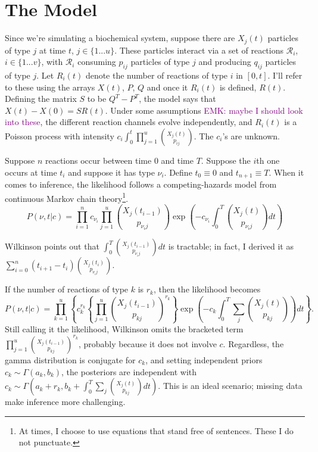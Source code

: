 \documentclass{article}
\newcommand\EMK[1]{\textcolor{purple}{EMK: #1}}
\begin{document}
\section{The Model}
Since we're simulating a biochemical system, suppose there are $X_{j}(t)$ particles of type $j$ at time $t$, $j\in \{1 ... u\}$. These particles interact via a set of reactions $\mathcal{R}_{i}$, $i\in \{1 ... v\}$, with $\mathcal{R}_{i}$ consuming $p_{ij}$ particles of type $j$ and producing $q_{ij}$ particles of type $j$. Let $R_{i}(t)$ denote the number of reactions of type $i$ in $[0,t]$. I'll refer to these using the arrays $X(t)$, $P$, $Q$ and once it $R_{i}(t)$ is defined, $R(t)$. Defining the matrix $S$ to be $Q^T-P^T$, the model says that $X(t) - X(0) = SR(t)$. Under some assumptions \EMK{maybe I should look into these}, the different reaction channels evolve independently, and $R_{i}(t)$ is a Poisson process with intensity $c_{i}\int_0^t \prod_{j=1}^u {{X_j(t)}\choose{p_{ij}}}$. %
The $c_{i}$'s are unknown.

Suppose $n$ reactions occur between time $0$ and time $T$. Suppose the $i$th one occurs at time $t_{i}$ and suppose it has type $\nu_{i}$. Define $t_0\equiv0$ and $t_{n+1}\equiv T$. When it comes to inference, the likelihood follows a competing-hazards model from continuous Markov chain theory\footnote{At times, I choose to use equations that stand free of sentences. These I do not punctuate.}. 
$$P(\nu, t|c) = \prod_{i=1}^n c_{\nu_{i}} \prod_{j=1}^u {{X_{j}(t_{i-1})}\choose{p_{{\nu_{i}}j}}}\exp\left(-c_{\nu_{i}}\int_0^T {{X_j(t)}\choose{p_{{\nu_{i}}j}}} dt\right)$$

Wilkinson points out that $\int_0^T {{X_j(t_{i-1})}\choose{p_{{\nu_{i}}j}}}dt$ is tractable; in fact, I derived it as $\sum_{i=0}^{n} (t_{i+1}-t_{i}) {{X_j(t_{i})}\choose{p_{{\nu_{i}}j}}}$. 

If the number of reactions of type $k$ is $r_k$, then the likelihood becomes 
$$P(\nu, t|c) = \prod_{k=1}^u \left\{ c_{k}^{r_k} 
\left\{\prod_{j=1}^u { X_{j}(t_{i-1})\choose p_{kj}}^{r_k}\right\}\exp\left(-c_{k}\int_0^T \sum_j{X_j(t)\choose p_{kj}} \right)dt\right\}.$$  
Still calling it the likelihood, Wilkinson omits the bracketed term $\prod_{j=1}^u { X_{j}(t_{i-1})\choose p_{kj}}^{r_k}$, probably because it does not involve $c$. Regardless, the gamma distribution is conjugate for $c_k$, and setting independent priors $c_k\sim \Gamma(a_k, b_k)$, the posteriors are independent with $c_k\sim \Gamma(a_k+r_k, b_k+\int_0^T \sum_j {X_j(t) \choose p_{kj}}dt )$. This is an ideal scenario; missing data make inference more challenging.
\end{document}
